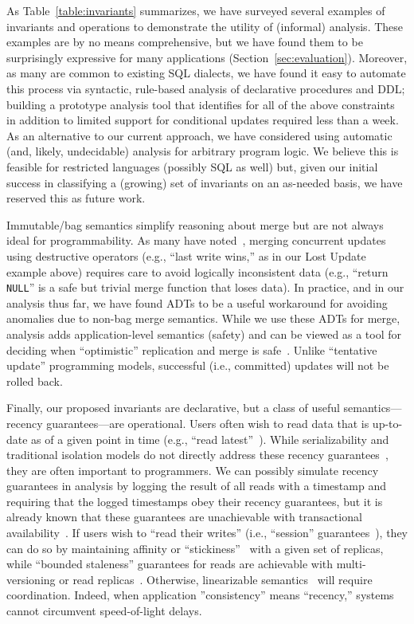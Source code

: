 As Table~\ref{table:invariants} summarizes, we have surveyed several
examples of invariants and operations to demonstrate the utility of
(informal) \iconfluence analysis. These examples are by no means
comprehensive, but we have found them to be surprisingly expressive
for many applications (Section~\ref{sec:evaluation}). Moreover, as
many are common to existing SQL dialects, we have found it easy to
automate this process via syntactic, rule-based analysis of
declarative procedures and DDL; building a prototype analysis tool
that identifies \iconfluence for all of the above constraints in
addition to limited support for conditional updates required less than
a week. As an alternative to our current approach, we have considered
using automatic (and, likely, undecidable) analysis for arbitrary
program logic. We believe this is feasible for restricted languages
(possibly SQL as well) but, given our initial success in classifying a
(growing) set of invariants on an as-needed basis, we have reserved
this as future work.

Immutable/bag semantics simplify reasoning about merge but are not
always ideal for programmability. As many have
noted~\cite{bayou,tamer-book,dynamo}, merging concurrent updates using
destructive operators (e.g., ``last write wins,'' as in our Lost
Update example above) requires care to avoid logically inconsistent
data (e.g., ``return \texttt{NULL}'' is a safe but trivial merge
function that loses data). In practice, and in our analysis thus far,
we have found ADTs to be a useful workaround for avoiding anomalies
due to non-bag merge semantics. While we use these ADTs for merge,
\iconfluence analysis adds application-level semantics (safety) and
can be viewed as a tool for deciding when ``optimistic'' replication
and merge is safe~\cite{optimistic}. Unlike ``tentative update''
programming models, successful (i.e., committed) updates will not be
rolled back.

Finally, our proposed invariants are declarative, but a class of
useful semantics---recency guarantees---are operational. Users often
wish to read data that is up-to-date as of a given point in time
(e.g., ``read latest''~\cite{pnuts}). While serializability and
traditional isolation models do not directly address these recency
guarantees~\cite{adya-isolation}, they are often important to
programmers. We can possibly simulate recency guarantees in
\iconfluence analysis by logging the result of all reads with a
timestamp and requiring that the logged timestamps obey their recency
guarantees, but it is already known that these guarantees are
unachievable with transactional availability~\cite{hat-vldb}. If users
wish to ``read their writes'' (i.e., ``session''
guarantees~\cite{bayou}), they can do so by maintaining affinity or
``stickiness''~\cite{hat-vldb,vogels-defs} with a given set of
replicas, while ``bounded staleness'' guarantees for reads are
achievable with multi-versioning or read
replicas~\cite{pnuts}. Otherwise, linearizable
semantics~\cite{spanner} will require coordination. Indeed, when
application ''consistency'' means ``recency,'' systems cannot
circumvent speed-of-light delays.

